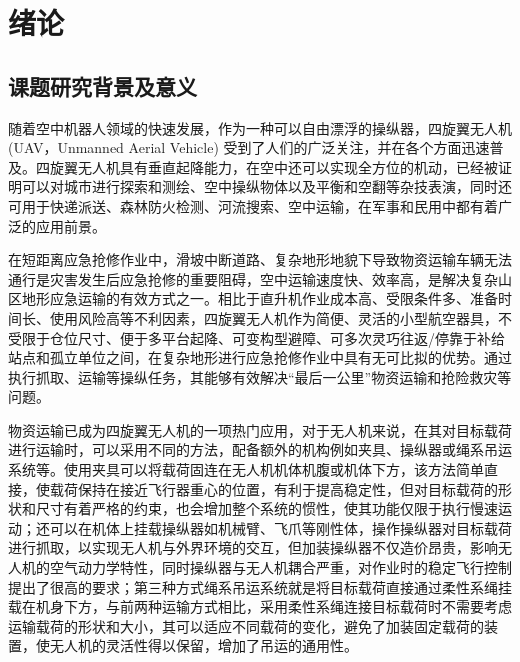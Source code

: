 \documentclass[lang=chs, degree=master, blindreview=false, winfonts=true]{yanputhesis}
\begin{document}
\tableofcontents                                            %
\mainmatter
\sDefault

\chapter{绪论}
\section{课题研究背景及意义}
随着空中机器人领域的快速发展，作为一种可以自由漂浮的操纵器，四旋翼无人机(UAV，Unmanned Aerial Vehicle) 受到了人们的广泛关注，并在各个方面迅速普及\cite{kimon_advances_2023}。四旋翼无人机具有垂直起降能力，在空中还可以实现全方位的机动，已经被证明可以对城市进行探索和测绘\cite{tomic2012toward}、空中操纵物体\cite{suarez2020benchmarks}以及平衡和空翻等杂技表演\cite{beul2018fast}，同时还可用于快递派送\cite{刘昂2020基于}、森林防火检测\cite{harikumar2018multi}、河流搜索\cite{nuske2015autonomous}、空中运输\cite{klausen2018cooperative}，在军事和民用中都有着广泛的应用前景。

在短距离应急抢修作业中，滑坡中断道路、复杂地形地貌下导致物资运输车辆无法通行是灾害发生后应急抢修的重要阻碍，空中运输速度快、效率高，是解决复杂山区地形应急运输的有效方式之一。相比于直升机作业成本高、受限条件多、准备时间长、使用风险高等不利因素，四旋翼无人机作为简便、灵活的小型航空器具，不受限于仓位尺寸、便于多平台起降、可变构型避障、可多次灵巧往返/停靠于补给站点和孤立单位之间，在复杂地形进行应急抢修作业中具有无可比拟的优势。通过执行抓取、运输等操纵任务，其能够有效解决“最后一公里”物资运输和抢险救灾等问题。

物资运输已成为四旋翼无人机的一项热门应用\cite{cruz2014autonomous}，对于无人机来说，在其对目标载荷进行运输时，可以采用不同的方法，配备额外的机构例如夹具、操纵器或绳系吊运系统等。使用夹具可以将载荷固连在无人机机体机腹或机体下方，该方法简单直接，使载荷保持在接近飞行器重心的位置，有利于提高稳定性，但对目标载荷的形状和尺寸有着严格的约束，也会增加整个系统的惯性，使其功能仅限于执行慢速运动\cite{Khalifa2017}；还可以在机体上挂载操纵器如机械臂、飞爪等刚性体，操作操纵器对目标载荷进行抓取，以实现无人机与外界环境的交互，但加装操纵器不仅造价昂贵，影响无人机的空气动力学特性，同时操纵器与无人机耦合严重，对作业时的稳定飞行控制提出了很高的要求；第三种方式绳系吊运系统就是将目标载荷直接通过柔性系绳挂载在机身下方，与前两种运输方式相比，采用柔性系绳连接目标载荷时不需要考虑运输载荷的形状和大小，其可以适应不同载荷的变化，避免了加装固定载荷的装置，使无人机的灵活性得以保留，增加了吊运的通用性。
\end{document}
